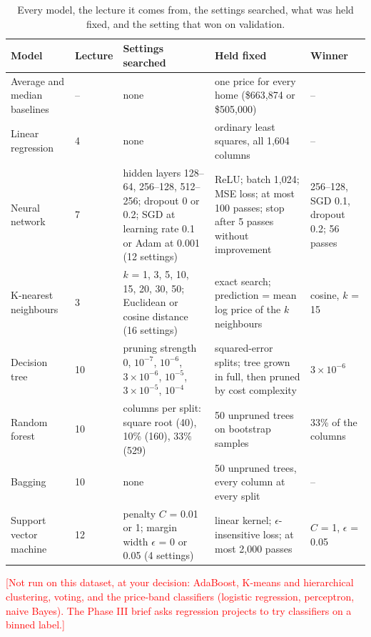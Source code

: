 \documentclass[sigconf,nonacm,10pt]{acmart}
\newcommand{\pending}[1]{\textcolor{red}{[#1]}}
\begin{document}
\begin{table}[t]
\caption{Every model, the lecture it comes from, the settings searched, what was held fixed, and the setting that won on validation.}
\label{tab:grids}
\small
\renewcommand{\arraystretch}{1.15}
\begin{tabularx}{\textwidth}{@{}L{2.6cm}L{0.9cm}YYL{3.1cm}@{}}
\toprule
Model & Lecture & Settings searched & Held fixed & Winner \\
\midrule
Average and median baselines & -- & none & one price for every home (\$663,874 or \$505,000) & -- \\
Linear regression & 4 & none & ordinary least squares, all 1,604 columns & -- \\
Neural network & 7 & hidden layers 128--64, 256--128, 512--256; dropout 0 or 0.2; SGD at learning rate 0.1 or Adam at 0.001 (12 settings) & ReLU; batch 1,024; MSE loss; at most 100 passes; stop after 5 passes without improvement & 256--128, SGD 0.1, dropout 0.2; 56 passes \\
K-nearest neighbours & 3 & $k$ = 1, 3, 5, 10, 15, 20, 30, 50; Euclidean or cosine distance (16 settings) & exact search; prediction = mean log price of the $k$ neighbours & cosine, $k$ = 15 \\
Decision tree & 10 & pruning strength 0, $10^{-7}$, $10^{-6}$, $3\times10^{-6}$, $10^{-5}$, $3\times10^{-5}$, $10^{-4}$ & squared-error splits; tree grown in full, then pruned by cost complexity & $3\times10^{-6}$ \\
Random forest & 10 & columns per split: square root (40), 10\% (160), 33\% (529) & 50 unpruned trees on bootstrap samples & 33\% of the columns \\
Bagging & 10 & none & 50 unpruned trees, every column at every split & -- \\
Support vector machine & 12 & penalty $C$ = 0.01 or 1; margin width $\epsilon$ = 0 or 0.05 (4 settings) & linear kernel; $\epsilon$-insensitive loss; at most 2,000 passes & $C$ = 1, $\epsilon$ = 0.05 \\
\bottomrule
\end{tabularx}
\end{table}

\pending{Not run on this dataset, at your decision: AdaBoost, K-means and hierarchical clustering, voting, and the price-band classifiers (logistic regression, perceptron, naive Bayes). The Phase III brief asks regression projects to try classifiers on a binned label.}

\end{document}

